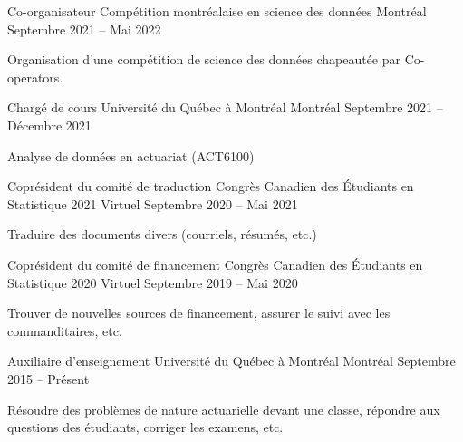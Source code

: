 
\begin{cventries}
    \cventry
    {Co-organisateur} %
    {Compétition montréalaise en science des données} %
    {Montréal} %
    {Septembre 2021 -- Mai 2022} %
    {
      \begin{cvitems} %
        \item{Organisation d'une compétition de science des données chapeautée par Co-operators.}
      \end{cvitems}
    }

  \cventry
    {Chargé de cours} %
    {Université du Québec à Montréal} %
    {Montréal} %
    {Septembre 2021 -- Décembre 2021} %
    {
      \begin{cvitems} %
        \item {Analyse de données en actuariat (ACT6100)}
      \end{cvitems}
    }

 \cventry
    {Coprésident du comité de traduction} %
    {Congrès Canadien des Étudiants en Statistique 2021} %
    {Virtuel} %
    {Septembre 2020 -- Mai 2021} %
    {
      \begin{cvitems} %
        \item {Traduire des documents divers (courriels, résumés, etc.)}
      \end{cvitems}
    }
    
  \cventry
    {Coprésident du comité de financement} %
    {Congrès Canadien des Étudiants en Statistique 2020} %
    {Virtuel} %
    {Septembre 2019 -- Mai 2020} %
    {
      \begin{cvitems} %
        \item {Trouver de nouvelles sources de financement, assurer le suivi avec les commanditaires, etc.}
      \end{cvitems}
    }

  \cventry
    {Auxiliaire d'enseignement} %
    {Université du Québec à Montréal} %
    {Montréal} %
    {Septembre 2015 -- Présent} %
    {
      \begin{cvitems} %
        \item {Résoudre des problèmes de nature actuarielle devant une classe, répondre aux questions des étudiants, corriger les examens, etc.}
      \end{cvitems}
    }


\end{cventries}
